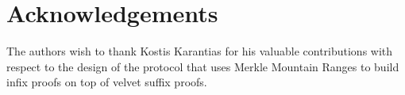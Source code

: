 \section{Acknowledgements}

The authors wish to thank Kostis Karantias for his valuable contributions with respect to
the design of the protocol that uses Merkle Mountain Ranges to build infix proofs on top
of velvet suffix proofs.
